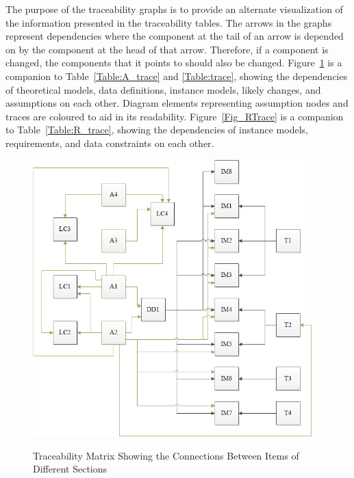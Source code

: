 \documentclass[12pt]{article}
\begin{document}
The purpose of the traceability graphs is to provide an alternate visualization 
of the information presented in the traceability tables. The arrows in the 
graphs represent dependencies where the component at the tail of an arrow is 
depended on by the component at the head of that arrow. Therefore, if a 
component is changed, the components that it points to should also be
changed. Figure~\ref{Fig_ATrace} is a companion to Table~\ref{Table:A_trace} 
and \ref{Table:trace}, showing the dependencies of theoretical models, data 
definitions, instance models, likely changes, and assumptions on each other. 
Diagram elements representing assumption nodes and traces are coloured to aid 
in its readability. Figure~\ref{Fig_RTrace} is a companion to 
Table~\ref{Table:R_trace}, showing the dependencies of instance models, 
requirements, and data constraints on each other.

 \begin{figure}[H]
 	\begin{center}
 		{
 			\includegraphics[width=0.96\textwidth]{figures/ATrace.png}
 		}
 		\caption{\label{Fig_ATrace} Traceability Matrix Showing the Connections 
 		Between Items of Different Sections}
 	\end{center}
 \end{figure}
\end{document}
